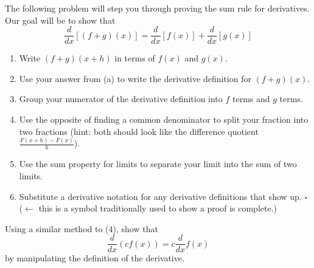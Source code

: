 \documentclass{ximera}
\begin{document}
\begin{exercise}
  The following problem will step you through proving the sum rule for derivatives. Our goal will be to show that $$\frac{d}{dx}[(f+g)(x)]=\frac{d}{dx}[f(x)]+\frac{d}{dx}[g(x)]$$
    \begin{enumerate}
        \item Write $(f+g)(x+h)$ in terms of $f(x)$ and $g(x)$.
        \item Use your answer from (a) to write the derivative definition for $(f+g)(x)$.
        \item Group your numerator of the derivative definition into $f$ terms and $g$ terms.
        \item Use the opposite of finding a common denominator to split your fraction into two fractions (hint: both should look like the difference quotient $\frac{F(x+h)-F(x)}{h}$).
        \item Use the sum property for limits to separate your limit into the sum of two limits.
        \item Substitute a derivative notation for any derivative definitions  that show up. $\square$ ($\leftarrow$ this is a symbol traditionally used to show a proof is complete.) 
    \end{enumerate}
\end{exercise}

\begin{exercise}
    Using a similar method to (4), show that $$ \frac{d}{dx}(cf(x))=c\frac{d}{dx}f(x)$$ by manipulating the definition of the derivative.
\end{exercise}
\end{document}

